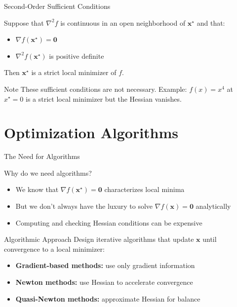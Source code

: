 \documentclass[aspectratio=1610]{beamer}
\begin{document}
\begin{frame}{Second-Order Sufficient Conditions}
  \begin{theorem}
    Suppose that $\nabla^2 f$ is continuous in an open neighborhood of $\mathbf{x}^\star$ and that:
    \begin{itemize}
      \item $\nabla f(\mathbf{x}^\star) = \mathbf{0}$
      \item $\nabla^2 f(\mathbf{x}^\star)$ is positive definite
    \end{itemize}
    Then $\mathbf{x}^\star$ is a strict local minimizer of $f$.
  \end{theorem}
  
  \vspace{0.3cm}
  \begin{block}{Note}
    These sufficient conditions are not necessary. Example: $f(x) = x^4$ at $x^\star = 0$ is a strict local minimizer but the Hessian vanishes.
  \end{block}
\end{frame}

\section{Optimization Algorithms}

\begin{frame}{The Need for Algorithms}
  \begin{block}{Why do we need algorithms?}
    \begin{itemize}
      \item We know that $\nabla f(\mathbf{x}^\star) = \mathbf{0}$ characterizes local minima
      \item But we don't always have the luxury to solve $\nabla f(\mathbf{x}) = \mathbf{0}$ analytically
      \item Computing and checking Hessian conditions can be expensive
    \end{itemize}
  \end{block}
  
  \vspace{0.5cm}
  \begin{block}{Algorithmic Approach}
    Design iterative algorithms that update $\mathbf{x}$ until convergence to a local minimizer:
    \begin{itemize}
      \item \textbf{Gradient-based methods:} use only gradient information
      \item \textbf{Newton methods:} use Hessian to accelerate convergence
      \item \textbf{Quasi-Newton methods:} approximate Hessian for balance
    \end{itemize}
  \end{block}
\end{frame}
\end{document}

